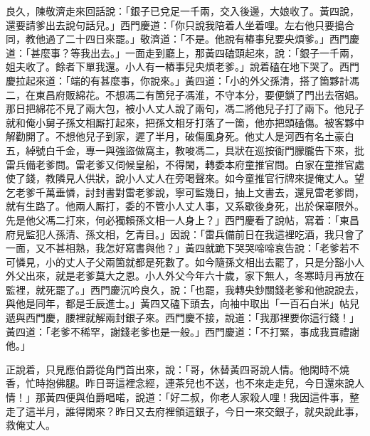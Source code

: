 良久，陳敬濟走來回話說：「銀子已兌足一千兩，交入後邊，大娘收了。黃四說，還要請爹出去說句話兒。」西門慶道：「你只說我陪着人坐着哩。左右他只要搗合同，教他過了二十四日來罷。」敬濟道：「不是。他說有樁事兒要央煩爹。」西門慶道：「甚麼事？等我出去。」一面走到廳上，那黃四磕頭起來，說：「銀子一千兩，姐夫收了。餘者下單我還。小人有一樁事兒央煩老爹。」說着磕在地下哭了。西門慶拉起來道：「端的有甚麼事，你說來。」黃四道：「小的外父孫清，搭了箇夥計馮二，在東昌府販綿花。不想馮二有箇兒子馮淮，不守本分，要便鎖了門出去宿娼。那日把綿花不見了兩大包，被小人丈人說了兩句，馮二將他兒子打了兩下。他兒子就和俺小舅子孫文相厮打起來，把孫文相牙打落了一箇，他亦把頭磕傷。被客夥中解勸開了。不想他兒子到家，遲了半月，破傷風身死。他丈人是河西有名土豪白五，綽號白千金，專一與強盜做窩主，教唆馮二，具狀在巡按衙門朦朧告下來，批雷兵備老爹問。雷老爹又伺候皇船，不得閑，轉委本府童推官問。白家在童推官處使了錢，教隣見人供狀，說小人丈人在旁喝聲來。如今童推官行牌來提俺丈人。望乞老爹千萬垂憐，討封書對雷老爹說，寧可監幾日，抽上文書去，還見雷老爹問，就有生路了。他兩人厮打，委的不管小人丈人事，又系歇後身死，出於保辜限外。先是他父馮二打來，何必獨賴孫文相一人身上？」西門慶看了說帖，寫着：「東昌府見監犯人孫清、孫文相，乞青目。」因說：「雷兵備前日在我這裡吃酒，我只會了一面，又不甚相熟，我怎好寫書與他？」黃四就跪下哭哭啼啼哀告說：「老爹若不可憐見，小的丈人子父兩箇就都是死數了。如今隨孫文相出去罷了，只是分豁小人外父出來，就是老爹莫大之恩。小人外父今年六十歲，家下無人，冬寒時月再放在監裡，就死罷了。」西門慶沉吟良久，說：「也罷，我轉央鈔關錢老爹和他說說去，與他是同年，都是壬辰進士。」黃四又磕下頭去，向袖中取出「一百石白米」帖兒遞與西門慶，腰裡就解兩封銀子來。西門慶不接，說道：「我那裡要你這行錢！」黃四道：「老爹不稀罕，謝錢老爹也是一般。」西門慶道：「不打緊，事成我買禮謝他。」

正說着，只見應伯爵從角門首出來，說：「哥，休替黃四哥說人情。他閑時不燒香，忙時抱佛腿。{}昨日哥這裡念經，連茶兒也不送，也不來走走兒，今日還來說人情！」那黃四便與伯爵唱喏，說道：「好二叔，你老人家殺人哩！{}我因這件事，整走了這半月，誰得閑來？昨日又去府裡領這銀子，今日一來交銀子，就央說此事，救俺丈人。

